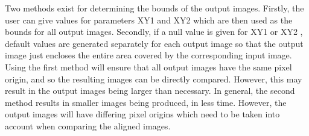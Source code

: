 \begin{small}
{{      Two methods exist for determining the bounds of the output
      images.  Firstly, the user can give values for parameters XY1
      and XY2 which are then used as the bounds for all output images.
      Secondly, if a null value is given for XY1 or XY2 , default
      values are generated separately for each output image so that the
      output image just encloses the entire area covered by the
      corresponding input image. Using the first method will ensure
      that all output images have the same pixel origin, and so the
      resulting images can be directly compared. However, this may
      result in the output images being larger than necessary. In
      general, the second method results in smaller images being
      produced, in less time. However, the output images will have
      differing pixel origins which need to be taken into account when
      comparing the aligned images.

}}
\end{small}
